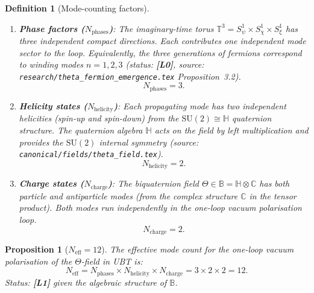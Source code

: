 \documentclass[11pt,a4paper]{article}
\newtheorem{proposition}{Proposition}
\newtheorem{definition}{Definition}
\newcommand{\Lzero}{\textbf{[L0]}}
\newcommand{\Lone}{\textbf{[L1]}}
\begin{document}
\begin{definition}[Mode-counting factors]\label{def:factors}
\quad
\begin{enumerate}
  \item \textbf{Phase factors ($N_{\mathrm{phases}}$)}: The imaginary-time
    torus $\mathbb{T}^3 = S^1_\psi\times S^1_\chi\times S^1_\xi$ has three
    independent compact directions.  Each contributes one independent mode
    sector to the loop.  Equivalently, the three generations of fermions
    correspond to winding modes $n=1,2,3$ (status: \Lzero, source:
    \texttt{research/theta\_fermion\_emergence.tex} Proposition~3.2).
    \[
      N_{\mathrm{phases}} = 3.
    \]

  \item \textbf{Helicity states ($N_{\mathrm{helicity}}$)}: Each propagating
    mode has two independent helicities (spin-up and spin-down) from the
    $\mathrm{SU}(2)\cong\mathbb{H}$ quaternion structure.
    The quaternion algebra $\mathbb{H}$ acts on the field by left
    multiplication and provides the $\mathrm{SU}(2)$ internal symmetry
    (source: \texttt{canonical/fields/theta\_field.tex}).
    \[
      N_{\mathrm{helicity}} = 2.
    \]

  \item \textbf{Charge states ($N_{\mathrm{charge}}$)}: The biquaternion
    field $\Theta\in\mathbb{B}=\mathbb{H}\otimes\mathbb{C}$ has both
    particle and antiparticle modes (from the complex structure $\mathbb{C}$
    in the tensor product).  Both modes run independently in the one-loop
    vacuum polarisation loop.
    \[
      N_{\mathrm{charge}} = 2.
    \]
\end{enumerate}
\end{definition}

\begin{proposition}[$N_{\mathrm{eff}} = 12$]\label{prop:neff}
  The effective mode count for the one-loop vacuum polarisation of the
  $\Theta$-field in UBT is:
  \begin{equation}
  \label{eq:neff_12}
    N_{\mathrm{eff}}
    = N_{\mathrm{phases}}\times N_{\mathrm{helicity}}\times N_{\mathrm{charge}}
    = 3\times 2\times 2
    = 12.
  \end{equation}
  Status: \Lone{} given the algebraic structure of $\mathbb{B}$.
\end{proposition}
\end{document}
